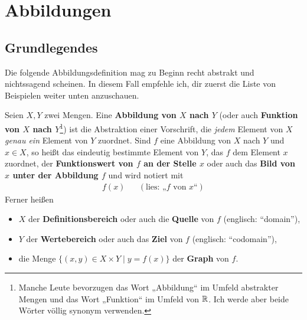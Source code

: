 



\chapter{Abbildungen}


\section{Grundlegendes}


Die folgende Abbildungsdefinition mag zu Beginn recht abstrakt und nichtssagend scheinen. In diesem Fall empfehle ich, dir zuerst die Liste von Beispielen weiter unten anzuschauen.


\begin{de}[Abbildung] \label{def:abbildung}     
    Seien $X,Y$ zwei Mengen. Eine \textbf{Abbildung von $X$ nach $Y$} (oder auch \textbf{Funktion von $X$ nach $Y$}\footnote{Manche Leute bevorzugen das Wort „Abbildung“ im Umfeld abstrakter Mengen und das Wort „Funktion“ im Umfeld von $\mathbb R$. Ich werde aber beide Wörter völlig synonym verwenden.}) ist die Abstraktion einer Vorschrift, die \emph{jedem} Element von $X$ \emph{genau ein} Element von $Y$ zuordnet. Sind $f$ eine Abbildung von $X$ nach $Y$ und $x\in X$, so heißt das eindeutig bestimmte Element von $Y$, das $f$ dem Element $x$ zuordnet, der \textbf{Funktionswert von $f$ an der Stelle $x$} oder auch das \textbf{Bild von $x$ unter der Abbildung $f$} und wird notiert mit
    \begin{align*}
        f(x) && (\text{lies: „$f$ von $x$“})
    \end{align*}
    Ferner heißen
    \begin{itemize}
        \item $X$ der \textbf{Definitionsbereich} oder auch die \textbf{Quelle} von $f$ (englisch: ``domain''),
        \item $Y$ der \textbf{Wertebereich} oder auch das \textbf{Ziel} von $f$ (englisch: ``codomain''),
        \item die Menge $\{(x,y)\in X\times Y\mid y=f(x)\}$ der \textbf{Graph} von $f$.
    \end{itemize}
\end{de}


